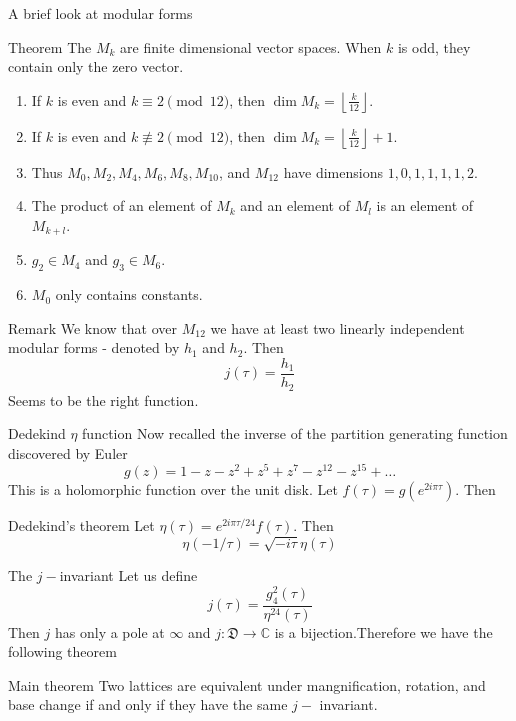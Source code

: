 \documentclass[pdf]{beamer}
\begin{document}
\begin{frame}{A brief look at modular forms}
\begin{block}{Theorem}
    The $M_k$ are finite dimensional vector spaces. When $k$ is odd, they contain only the zero vector.
\begin{enumerate}
    \item If $k$ is even and $k \equiv 2 \pmod{12}$, then $\dim M_k = \left\lfloor \frac{k}{12} \right\rfloor$.
    \item If $k$ is even and $k \not\equiv 2 \pmod{12}$, then $\dim M_k = \left\lfloor \frac{k}{12} \right\rfloor + 1$.
    \item Thus $M_0, M_2, M_4, M_6, M_8, M_{10}$, and $M_{12}$ have dimensions $1, 0, 1, 1, 1, 1, 2$.
    \item The product of an element of $M_k$ and an element of $M_l$ is an element of $M_{k+l}$.
    \item $g_2 \in M_4$ and $g_3 \in M_6$.
    \item $M_0$ only contains constants.
\end{enumerate}
\end{block}
\end{frame}
\begin{frame}{Remark}
    We know that over $M_{12}$ we have at least two linearly independent modular forms - denoted by $h_1$ and $h_2$. Then
    \[ j(\tau) = \dfrac{h_1}{h_2}\]
    Seems to be the right function.
\end{frame}
\begin{frame}{Dedekind $\eta$ function}
    Now recalled the inverse of the partition generating function discovered by Euler
    \[g(z) = 1-z-z^2+z^5+z^7 - z^{12}-z^{15}+\ldots\]
This is a holomorphic function over the unit disk. Let $f(\tau) = g(e^{2i\pi\tau})$. Then
\begin{block}{Dedekind's theorem}
    Let $\eta(\tau) = e^{2i\pi\tau/24}f(\tau)$. Then 
    \[\eta(-1/\tau) = \sqrt{-i\tau}\eta(\tau)\]
\end{block}
\end{frame}
\begin{frame}{The $j-$invariant}
Let us define 
\[j(\tau) = \dfrac{g_4^2(\tau)}{\eta^{24}(\tau)}\]
Then $j$ has only a pole at $\infty$ and $j \colon \mathfrak{D} \to \mathbb{C}$ is a bijection.\pause Therefore we have the following theorem
\begin{block}{Main theorem}
    Two lattices are equivalent under mangnification, rotation, and base change if and only if they have the same $j-$ invariant.
\end{block}
\end{frame}
\end{document}
